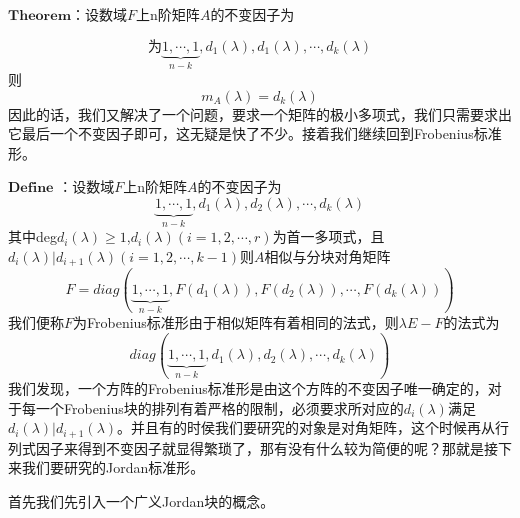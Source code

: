 \documentclass[lang=cn,10pt]{elegantbook}
\begin{document}
$\mathbf{Theorem}$：设数域$\mathit{F}$上n阶矩阵$\mathit{A}$的不变因子为

\begin{equation*}
	为\underset{n-k}{\underbrace{1,\cdots ,1} }, d_{1}(\lambda ),d_{1}(\lambda ),\cdots,d_{k}(\lambda )
\end{equation*}
则
\begin{equation*}
	m_{\mathit{A}}(\lambda)=d_{k}(\lambda )
\end{equation*}
因此的话，我们又解决了一个问题，要求一个矩阵的极小多项式，我们只需要求出它最后一个不变因子即可，这无疑是快了不少。接着我们继续回到Frobenius标准形。

$\mathbf{Define}$ ：设数域$\mathit{F}$上n阶矩阵$\mathit{A}$的不变因子为
\begin{equation*}
	\underset{n-k}{\underbrace{1,\cdots ,1} }, d_{1}(\lambda ),d_{2}(\lambda ),\cdots,d_{k}(\lambda )
\end{equation*}
其中deg$d_{i}(\lambda )\ge 1$,$d_{i}(\lambda )(i=1,2,\cdots,r)$为首一多项式，且$d_{i}(\lambda )|d_{i+1}(\lambda )(i=1,2,\cdots,k-1)$则$\mathit{A}$相似与分块对角矩阵
\begin{equation*}
	F=diag(\underset{n-k}{\underbrace{1,\cdots ,1} }, F(d_{1}(\lambda )),F(d_{2}(\lambda )),\cdots,F(d_{k}(\lambda )))
\end{equation*}
我们便称$\mathit{F}$为Frobenius标准形由于相似矩阵有着相同的法式，则$\mathit{\lambda E-F}$的法式为
\begin{equation*}
	diag(\underset{n-k}{\underbrace{1,\cdots ,1} }, d_{1}(\lambda ),d_{2}(\lambda ),\cdots,d_{k}(\lambda ))
\end{equation*}
我们发现，一个方阵的Frobenius标准形是由这个方阵的不变因子唯一确定的，对于每一个Frobenius块的排列有着严格的限制，必须要求所对应的$d_{i}(\lambda )$满足$d_{i}(\lambda )|d_{i+1}(\lambda )。$并且有的时侯我们要研究的对象是对角矩阵，这个时候再从行列式因子来得到不变因子就显得繁琐了，那有没有什么较为简便的呢？那就是接下来我们要研究的Jordan标准形。

首先我们先引入一个广义Jordan块的概念。
\end{document}
